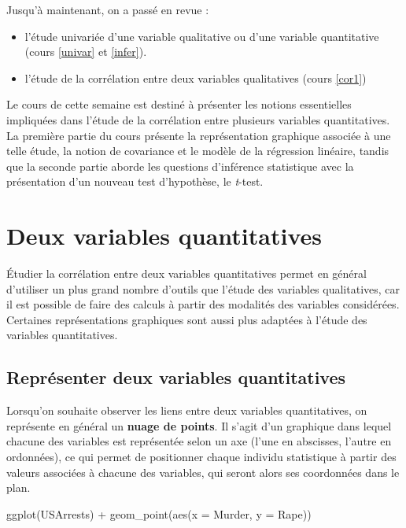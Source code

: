 \documentclass[
]{book}
\newenvironment{Shaded}{\begin{snugshade}}{\end{snugshade}}
\newcommand{\AttributeTok}[1]{\textcolor[rgb]{0.77,0.63,0.00}{#1}}
\newcommand{\FunctionTok}[1]{\textcolor[rgb]{0.00,0.00,0.00}{#1}}
\newcommand{\NormalTok}[1]{#1}
\newcommand{\SpecialCharTok}[1]{\textcolor[rgb]{0.00,0.00,0.00}{#1}}
\providecommand{\tightlist}{%
  \setlength{\itemsep}{0pt}\setlength{\parskip}{0pt}}
\begin{document}
Jusqu'à maintenant, on a passé en revue :

\begin{itemize}
\tightlist
\item
  l'étude univariée d'une variable qualitative ou d'une variable quantitative (cours \ref{univar} et \ref{infer}).
\item
  l'étude de la corrélation entre deux variables qualitatives (cours \ref{cor1})
\end{itemize}

Le cours de cette semaine est destiné à présenter les notions
essentielles impliquées dans l'étude de la corrélation entre plusieurs
variables quantitatives. La première partie du cours présente la
représentation graphique associée à une telle étude, la notion de
covariance et le modèle de la régression linéaire, tandis que la seconde
partie aborde les questions d'inférence statistique avec la présentation
d'un nouveau test d'hypothèse, le \emph{t}-test.

\hypertarget{deux-variables-quantitatives}{%
\section{Deux variables quantitatives}\label{deux-variables-quantitatives}}

Étudier la corrélation entre deux variables quantitatives permet en
général d'utiliser un plus grand nombre d'outils que l'étude des
variables qualitatives, car il est possible de faire des calculs à
partir des modalités des variables considérées. Certaines
représentations graphiques sont aussi plus adaptées à l'étude des
variables quantitatives.

\hypertarget{repruxe9senter-deux-variables-quantitatives}{%
\subsection{Représenter deux variables quantitatives}\label{repruxe9senter-deux-variables-quantitatives}}

Lorsqu'on souhaite observer les liens entre deux variables
quantitatives, on représente en général un \textbf{nuage de points}. Il
s'agit d'un graphique dans lequel chacune des variables est représentée
selon un axe (l'une en abscisses, l'autre en ordonnées), ce qui permet de
positionner chaque individu statistique à partir des valeurs associées à
chacune des variables, qui seront alors ses coordonnées dans le plan.

\begin{Shaded}
\begin{Highlighting}[]
\FunctionTok{ggplot}\NormalTok{(USArrests) }\SpecialCharTok{+} \FunctionTok{geom\_point}\NormalTok{(}\FunctionTok{aes}\NormalTok{(}\AttributeTok{x =}\NormalTok{ Murder, }\AttributeTok{y =}\NormalTok{ Rape))}
\end{Highlighting}
\end{Shaded}
\end{document}
